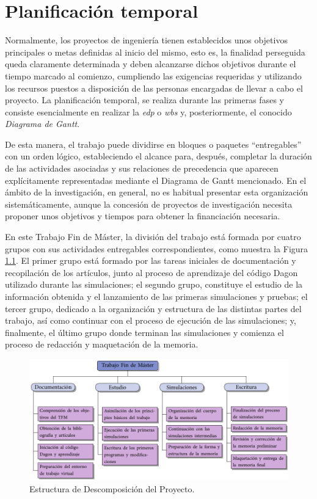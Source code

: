 \chapter{Planificación temporal}\label{cap:9}
Normalmente, los proyectos de ingeniería tienen establecidos unos objetivos principales o metas definidas al inicio del mismo, esto es, la finalidad perseguida queda claramente determinada y deben alcanzarse dichos objetivos durante el tiempo marcado al comienzo, cumpliendo las exigencias requeridas y utilizando los recursos puestos a disposición de las personas encargadas de llevar a cabo el proyecto. La planificación temporal, se realiza durante las primeras fases y consiste esencialmente en realizar la \emph{\acrfull{edp}} o \emph{\acrfull{wbs}} y, posteriormente, el conocido \emph{Diagrama de Gantt}.

De esta manera, el trabajo puede dividirse en bloques o paquetes \enquote{entregables} con un orden lógico, estableciendo el alcance para, después, completar la duración de las actividades asociadas y sus relaciones de precedencia que aparecen explícitamente representadas mediante el Diagrama de Gantt mencionado. En el ámbito de la investigación, en general, no es habitual presentar esta organización sistemáticamente, aunque la concesión de proyectos de investigación necesita proponer unos objetivos y tiempos para obtener la financiación necesaria. 

En este Trabajo Fin de Máster, la división del trabajo está formada por cuatro grupos con sus actividades entregables correspondientes, como muestra la Figura \ref{fig:ch9_edp}. El primer grupo está formado por las tareas iniciales de documentación y recopilación de los artículos, junto al proceso de aprendizaje del código Dagon utilizado durante las simulaciones; el segundo grupo, constituye el estudio de la información obtenida y el lanzamiento de las primeras simulaciones y pruebas; el tercer grupo, dedicado a la organización y estructura de las distintas partes del trabajo, así como continuar con el proceso de ejecución de las simulaciones; y, finalmente, el último grupo donde terminan las simulaciones y comienza el proceso de redacción y maquetación de la memoria.

\begin{figure}[htbp]
  \centering
  \includegraphics[width=\textwidth]{Figuras/ch9_edp.pdf}
  \caption{Estructura de Descomposición del Proyecto.}
  \label{fig:ch9_edp}
\end{figure}

